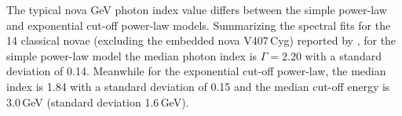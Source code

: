 \documentclass[a4paper,fleqn,usenatbib]{mnras}
\begin{document}
%
%
%


The typical nova GeV photon index value 
differs between the simple power-law and
exponential cut-off power-law models.
Summarizing the spectral fits for the 14 classical novae (excluding the
embedded nova V407\,Cyg) reported by 
\cite{2016ApJ...826..142C,2017NatAs...1..697L,2018A&A...609A.120F,2019ApJ...872...86N,2021ApJ...910..134G,2020ApJ...905..114L,2022MNRAS.514.2239S,2022arXiv220110644A}, 
for the simple power-law model the median photon index is $\Gamma = 2.20$ 
with a standard deviation of 0.14. Meanwhile for the exponential cut-off 
power-law, the median index is 1.84 with a standard deviation of 0.15 and 
the median cut-off energy is 3.0\,GeV (standard deviation 1.6\,GeV). 
\end{document}
